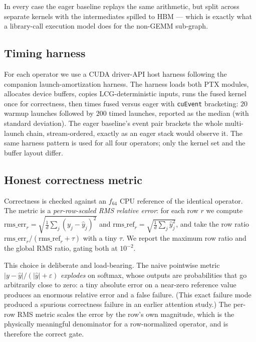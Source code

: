 \documentclass[11pt,a4paper]{article}
\begin{document}
In every case the eager baseline replays the same arithmetic, but split across
separate kernels with the intermediates spilled to HBM --- which is exactly what
a library-call execution model does for the non-GEMM sub-graph.

\subsection{Timing harness}

For each operator we use a CUDA driver-API host harness following the
companion launch-amortization harness. The harness loads both PTX modules,
allocates device buffers, copies LCG-deterministic inputs, runs the fused kernel
once for correctness, then times fused versus eager with \texttt{cuEvent}
bracketing: $20$ warmup launches followed by $200$ timed launches, reported as
the median (with standard deviation). The eager baseline's event pair brackets
the whole multi-launch chain, stream-ordered, exactly as an eager stack would
observe it. The same harness pattern is used for all four operators; only the
kernel set and the buffer layout differ.

\subsection{Honest correctness metric}

Correctness is checked against an $f_{64}$ CPU reference of the identical
operator. The metric is a \emph{per-row-scaled RMS relative error}: for each row
$r$ we compute $\mathrm{rms\_err}_r = \sqrt{\frac1d\sum_j (y_j - \hat y_j)^2}$
and $\mathrm{rms\_ref}_r = \sqrt{\frac1d\sum_j \hat y_j^2}$, and take the row
ratio $\mathrm{rms\_err}_r / (\mathrm{rms\_ref}_r + \tau)$ with a tiny $\tau$.
We report the maximum row ratio and the global RMS ratio, gating both at
$10^{-2}$.

This choice is deliberate and load-bearing. The naive pointwise metric
$|y-\hat y|/(|\hat y|+\varepsilon)$ \emph{explodes} on softmax, whose outputs are
probabilities that go arbitrarily close to zero: a tiny absolute error on a
near-zero reference value produces an enormous relative error and a false
failure. (This exact failure mode produced a spurious correctness failure in an
earlier attention study.) The per-row RMS metric scales the error by the
row's own magnitude, which is the physically meaningful denominator for a
row-normalized operator, and is therefore the correct gate.

\end{document}
